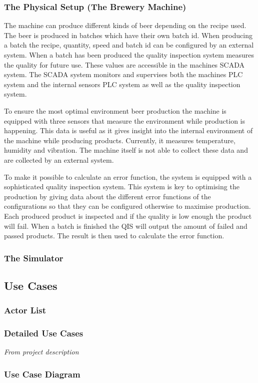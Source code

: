 \subsubsection{The Physical Setup (The Brewery Machine)}

The machine can produce different kinds of beer depending on the recipe
used. The beer is produced in batches which have their own batch id. When 
producing a batch the recipe, quantity, speed and batch id can be configured by 
an external system. When a batch has been produced the quality inspection system 
measures the quality for future use. These values are accessible in the machines 
SCADA system. The SCADA system monitors and supervises both the machines PLC 
system and the internal sensors PLC system as well as the quality inspection 
system.

To ensure the most optimal environment beer production the 
machine is equipped with three sensors that measure the environment while 
production is happening. This data is useful as it gives insight into the 
internal environment of the machine while producing products. Currently, it 
measures temperature, humidity and vibration. The machine itself is not able to 
collect these data and are collected by an external system.

To make it possible to calculate an error function, the system is 
equipped with a sophisticated quality inspection system. This system is key to 
optimising the production by giving data about the different error functions of 
the configurations so that they can be configured otherwise to maximise 
production. Each produced product is inspected and if the quality is low enough
the product will fail. When a batch is finished the QIS will output the amount 
of failed and passed products. The result is then used to calculate the error
function.


\subsubsection{The Simulator}


\subsection{Use Cases}

\subsubsection{Actor List}

\subsubsection{Detailed Use Cases}
\textit{From project description}

\subsubsection{Use Case Diagram}
